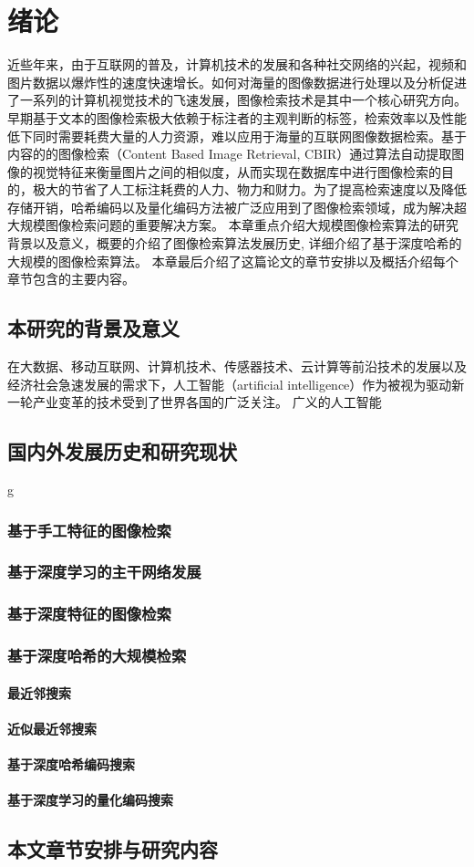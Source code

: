 
\chapter{绪论}
近些年来，由于互联网的普及，计算机技术的发展和各种社交网络的兴起，视频和图片数据以爆炸性的速度快速增长。如何对海量的图像数据进行处理以及分析促进了一系列的计算机视觉技术的飞速发展，图像检索技术是其中一个核心研究方向。早期基于文本的图像检索极大依赖于标注者的主观判断的标签，检索效率以及性能低下同时需要耗费大量的人力资源，难以应用于海量的互联网图像数据检索。基于内容的的图像检索（Content Based Image Retrieval, CBIR）通过算法自动提取图像的视觉特征来衡量图片之间的相似度，从而实现在数据库中进行图像检索的目的，极大的节省了人工标注耗费的人力、物力和财力。为了提高检索速度以及降低存储开销，哈希编码以及量化编码方法被广泛应用到了图像检索领域，成为解决超大规模图像检索问题的重要解决方案。 本章重点介绍大规模图像检索算法的研究背景以及意义，概要的介绍了图像检索算法发展历史, 详细介绍了基于深度哈希的大规模的图像检索算法。 本章最后介绍了这篇论文的章节安排以及概括介绍每个章节包含的主要内容。
\section{本研究的背景及意义}
在大数据、移动互联网、计算机技术、传感器技术、云计算等前沿技术的发展以及经济社会急速发展的需求下，人工智能（artificial intelligence）作为被视为驱动新一轮产业变革的技术受到了世界各国的广泛关注。 广义的人工智能\cite{russell2010artificial}
\section{国内外发展历史和研究现状}g
\subsection{基于手工特征的图像检索}
\subsection{基于深度学习的主干网络发展}
\subsection{基于深度特征的图像检索}
\subsection{基于深度哈希的大规模检索}
\subsubsection{最近邻搜索}
\subsubsection{近似最近邻搜索}
\subsubsection{基于深度哈希编码搜索}
\subsubsection{基于深度学习的量化编码搜索}
\section{本文章节安排与研究内容}